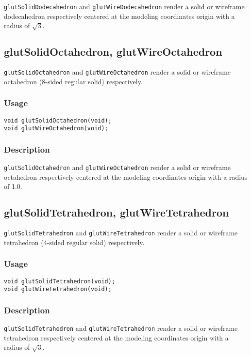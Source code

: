 {\tt glutSolidDodecahedron} and {\tt glutWireDodecahedron} render a solid or wireframe
dodecahedron respectively centered at the modeling coordinates origin with a radius of $\sqrt{3}$.

\subsection{glutSolidOctahedron, glutWireOctahedron}

{\tt glutSolidOctahedron} and {\tt glutWireOctahedron} render a solid or
wireframe octahedron (8-sided regular solid) respectively.

\subsubsection*{Usage}
\begin{verbatim}
void glutSolidOctahedron(void);
void glutWireOctahedron(void);
\end{verbatim}

\subsubsection*{Description}

{\tt glutSolidOctahedron} and {\tt glutWireOctahedron} render a solid or
wireframe octahedron respectively centered at the modeling coordinates origin with a radius of 1.0.

\subsection{glutSolidTetrahedron, glutWireTetrahedron}

{\tt glutSolidTetrahedron} and {\tt glutWireTetrahedron} render a solid or wireframe
tetrahedron (4-sided regular solid) respectively.

\subsubsection*{Usage}
\begin{verbatim}
void glutSolidTetrahedron(void);
void glutWireTetrahedron(void);
\end{verbatim}

\subsubsection*{Description}

{\tt glutSolidTetrahedron} and {\tt glutWireTetrahedron} render a solid or wireframe
tetrahedron respectively centered at the modeling coordinates origin with a radius of $\sqrt{3}$.


